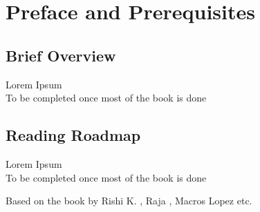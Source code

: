 \section{Preface and Prerequisites}

\subsection{Brief Overview}

Lorem Ipsum\\
To be completed once most of the book is done


\subsection{Reading Roadmap}

Lorem Ipsum\\
To be completed once most of the book is done



Based on the book by Rishi K. \cite{rishi_2013}, Raja \cite{velu_2020}, Macros Lopez \cite{marcos_2018} etc.



